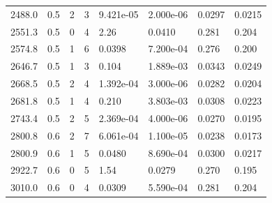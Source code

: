 \documentclass[preview]{standalone}
\begin{document}
{{{\begin{tabular}{L{1.2cm}C{1.2cm} C{0.3cm}C{0.5cm} C{1.4cm}C{1.4cm} C{1.4cm}C{1.4cm}}
  2488.0  &   0.5  & 2     &  3 &  9.421e-05  & 2.000e-06  & 0.0297 &  0.0215   \\ 
  2551.3  &   0.5  & 0     &  4 &  2.26  & 0.0410  & 0.281 &  0.204   \\ 
  2574.8  &   0.5  & 1     &  6 &  0.0398  & 7.200e-04  & 0.276 &  0.200   \\ 
  2646.7  &   0.5  & 1     &  3 &  0.104  & 1.889e-03  & 0.0343 &  0.0249   \\ 
  2668.5  &   0.5  & 2     &  4 &  1.392e-04  & 3.000e-06  & 0.0282 &  0.0204   \\ 
  2681.8  &   0.5  & 1     &  4 &  0.210  & 3.803e-03  & 0.0308 &  0.0223   \\ 
  2743.4  &   0.5  & 2     &  5 &  2.369e-04  & 4.000e-06  & 0.0270 &  0.0195   \\ 
  2800.8  &   0.6  & 2     &  7 &  6.061e-04  & 1.100e-05  & 0.0238 &  0.0173   \\ 
  2800.9  &   0.6  & 1     &  5 &  0.0480  & 8.690e-04  & 0.0300 &  0.0217   \\ 
  2922.7  &   0.6  & 0     &  5 &  1.54  & 0.0279  & 0.270 &  0.195   \\ 
  3010.0  &   0.6  & 0     &  4 &  0.0309  & 5.590e-04  & 0.281 &  0.204   \\ 
\hline 
\end{tabular} 

}}}
\end{document}
